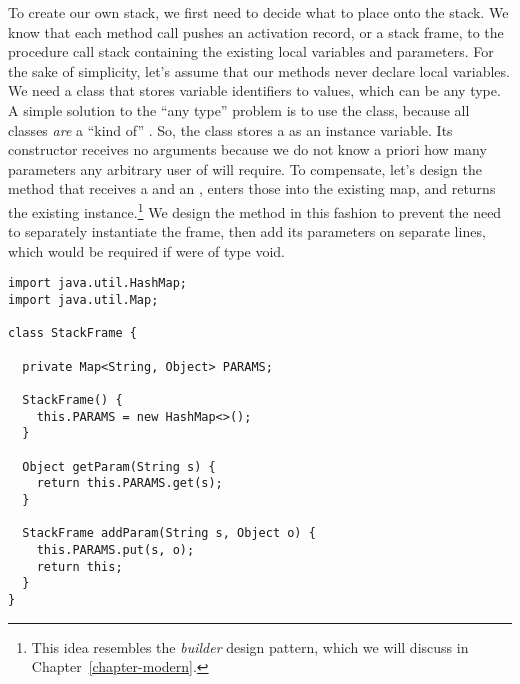 
To create our own stack, we first need to decide what to place onto the stack. We know that each method call pushes an activation record, or a stack frame, to the procedure call stack containing the existing local variables and parameters. For the sake of simplicity, let's assume that our methods never declare local variables. We need a class that stores variable identifiers to values, which can be any type. A simple solution to the ``any type'' problem is to use the  class, because all classes \emph{are} a ``kind of'' . So, the  class stores a  as an instance variable. Its constructor receives no arguments because we do not know a priori how many parameters any arbitrary user of  will require. To compensate, let's design the  method that receives a  and an , enters those into the existing map, and returns the existing instance.\footnote{This idea resembles the \emph{builder} design pattern, which we will discuss in Chapter~\ref{chapter-modern}.} We design the method in this fashion to prevent the need to separately instantiate the frame, then add its parameters on separate lines, which would be required if  were of type void.

\begin{lstlisting}[language=MyJava]
import java.util.HashMap;
import java.util.Map;

class StackFrame {

  private Map<String, Object> PARAMS;

  StackFrame() { 
    this.PARAMS = new HashMap<>(); 
  }

  Object getParam(String s) { 
    return this.PARAMS.get(s); 
  }

  StackFrame addParam(String s, Object o) {
    this.PARAMS.put(s, o);
    return this;
  }
}
\end{lstlisting}

